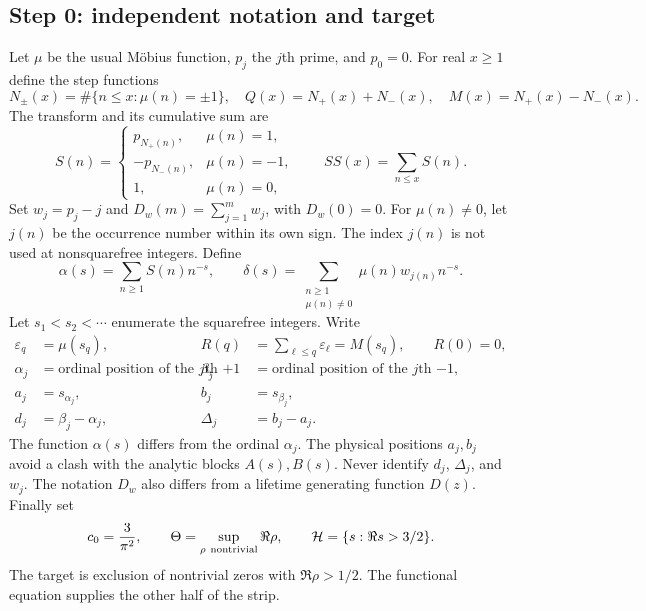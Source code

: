\documentclass[11pt]{amsart}
\numberwithin{equation}{section}
\theoremstyle{plain}
\theoremstyle{definition}
\theoremstyle{remark}
\begin{document}
\subsection{Step 0: independent notation and target}
\label{subsec:a12-definitions}
Let $\mu$ be the usual M\"obius function, $p_j$ the $j$th prime, and $p_0=0$.
For real $x\ge1$ define the step functions
\begin{equation}
\label{eq:a12-counts}
N_\pm(x)=\#\{n\le x:\mu(n)=\pm1\},\quad
Q(x)=N_+(x)+N_-(x),\quad M(x)=N_+(x)-N_-(x).
\end{equation}
The transform and its cumulative sum are
\begin{equation}
\label{eq:a12-S}
S(n)=
\begin{cases}
p_{N_+(n)},&\mu(n)=1,\\
-p_{N_-(n)},&\mu(n)=-1,\\
1,&\mu(n)=0,
\end{cases}
\qquad SS(x)=\sum_{n\le x}S(n).
\end{equation}
Set $w_j=p_j-j$ and $D_w(m)=\sum_{j=1}^m w_j$, with $D_w(0)=0$.
For $\mu(n)\ne0$, let $j(n)$ be the occurrence number within its own sign.
The index $j(n)$ is not used at nonsquarefree integers. Define
\begin{equation}
\label{eq:a12-series}
\alpha(s)=\sum_{n\ge1}S(n)n^{-s},\qquad
\delta(s)=\sum_{\substack{n\ge1\\\mu(n)\ne0}}\mu(n)w_{j(n)}n^{-s}.
\end{equation}
Let $s_1<s_2<\cdots$ enumerate the squarefree integers. Write
\begin{equation}
\label{eq:a12-pairs}
\begin{aligned}
\varepsilon_q&=\mu(s_q),&
R(q)&=\sum_{\ell\le q}\varepsilon_\ell=M(s_q),\qquad R(0)=0,\\
\alpha_j&=\text{ordinal position of the $j$th $+1$},&
\beta_j&=\text{ordinal position of the $j$th $-1$},\\
a_j&=s_{\alpha_j},&b_j&=s_{\beta_j},\\
d_j&=\beta_j-\alpha_j,&\Delta_j&=b_j-a_j.
\end{aligned}
\end{equation}
The function $\alpha(s)$ differs from the ordinal $\alpha_j$.
The physical positions $a_j,b_j$ avoid a clash with the analytic blocks
$A(s),B(s)$. Never identify $d_j$, $\Delta_j$, and $w_j$.
The notation $D_w$ also differs from a lifetime generating function $D(z)$.
Finally set
\begin{equation}
\label{eq:a12-H}
c_0=\frac3{\pi^2},\qquad
\Theta=\sup_{\rho\ {\rm nontrivial}}\Re\rho,\qquad
\mathcal H=\{s:\Re s>3/2\}.
\end{equation}
The target is exclusion of nontrivial zeros with $\Re\rho>1/2$.
The functional equation supplies the other half of the strip.
\end{document}
